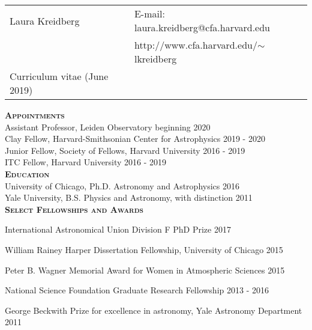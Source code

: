 \documentclass[12pt,letterpaper]{article}
\def\name{Laura Kreidberg}
\begin{document}
\sloppy




\begin{tabular}{@{}p{4.0in}@{}p{5.0in}}
    \LARGE{Laura Kreidberg}                  & E-mail: laura.kreidberg@cfa.harvard.edu\\  
    \,                                       & http://www.cfa.harvard.edu/$\sim$lkreidberg \\ 
    \large{Curriculum vitae} (June 2019) & \, \\
\end{tabular}

\vspace{8mm}

\textbf{\textsc{Appointments}}\\
Assistant Professor, Leiden Observatory \hfill beginning 2020\\
Clay Fellow, Harvard-Smithsonian Center for Astrophysics \hfill 2019 - 2020\\
Junior Fellow, Society of Fellows, Harvard University \hfill 2016 - 2019\\
ITC Fellow, Harvard University \hfill 2016 - 2019\\

\textbf{\textsc{Education}}\\
University of Chicago, Ph.D. Astronomy and Astrophysics \hfill 2016\\
Yale University, B.S. Physics and Astronomy, with distinction \hfill 2011\\

\textbf{\textsc{Select Fellowships and Awards}}
\begin{compactitem}[]
\item International Astronomical Union Division F PhD Prize \hfill 2017
\item William Rainey Harper Dissertation Fellowship, University of Chicago \hfill 2015
\item Peter B. Wagner Memorial Award for Women in Atmospheric Sciences \hfill 2015
\item National Science Foundation Graduate Research Fellowship \hfill 2013 - 2016
\item George Beckwith Prize for excellence in astronomy, Yale Astronomy Department \hfill2011
\end{compactitem}
\vspace{6mm}
\end{document}
